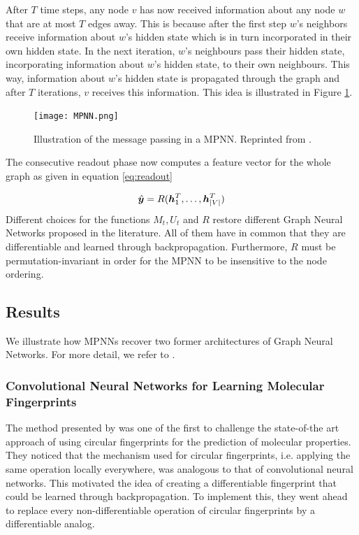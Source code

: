 After $T$ time steps, any node $v$ has now received information about any node $w$ that are at most $T$ edges away. This is because after the first step $w$'s neighbors receive information about $w$'s hidden state which is in turn incorporated in their own hidden state. In the next iteration, $w$'s neighbours pass their hidden state, incorporating information about $w$'s hidden state, to their own neighbours. This way, information about $w$'s hidden state is propagated through the graph and after $T$ iterations, $v$ receives this information. This idea is illustrated in Figure \ref{fig:mpnn}.
\begin{figure}[h]
	\centering 
	\texttt{[image: MPNN.png]}
	\caption{Illustration of the message passing in a MPNN. Reprinted from \cite{mpnn_graphics}. }
	\label{fig:mpnn}
\end{figure}

The consecutive readout phase now computes a feature vector for the whole graph as given in equation \ref{eq:readout}

\begin{equation}
	\hat{\boldsymbol y} = R(\boldsymbol h_1^T, \ldots, \boldsymbol h_{|V|}^T) \label{eq:readout}
\end{equation}
Different choices for the functions $M_t, U_t$ and $R$ restore different Graph Neural Networks proposed in the literature. All of them have in common that they are differentiable and learned through backpropagation. Furthermore, $R$ must be permutation-invariant in order for the MPNN to be insensitive to the node ordering.

\subsection{Results}
We illustrate how MPNNs recover two former architectures of Graph Neural Networks. For more detail, we refer to \cite{GilmerSRVD17}.

\subsubsection{Convolutional Neural Networks for Learning Molecular Fingerprints}
The method presented by \cite{duvenaud2015convolutional} was one of the first to challenge the state-of-the art approach of using circular fingerprints for the prediction of molecular properties. They noticed that the mechanism used for circular fingerprints, i.e. applying the same operation locally everywhere, was analogous to that of convolutional neural networks. This motivated the idea of creating a differentiable fingerprint that could be learned through backpropagation. To implement this, they went ahead to replace every non-differentiable operation of circular fingerprints by a differentiable analog.

